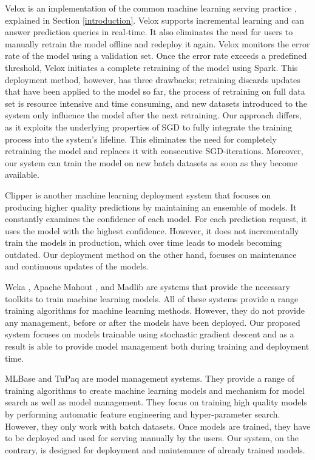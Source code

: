 \documentclass{vldb}
\begin{document}
Velox is an implementation of the common machine learning serving practice \cite{crankshaw2014missing}, explained in Section \ref{introduction}.
Velox supports incremental learning and can answer prediction queries in real-time.
It also eliminates the need for users to manually retrain the model offline and redeploy it again.
Velox monitors the error rate of the model using a validation set.
Once the error rate exceeds a predefined threshold, Velox initiates a complete retraining of the model using Spark. 
This deployment method, however, has three drawbacks; retraining discards updates that have been applied to the model so far, the process of retraining on full data set is resource intensive and time consuming, and new datasets introduced to the system only influence the model after the next retraining.
Our approach differs, as it exploits the underlying properties of SGD to fully integrate the training process into the system's lifeline.
This eliminates the need for completely retraining the model and replaces it with consecutive SGD-iterations.
Moreover, our system can train the model on new batch datasets as soon as they become available.

Clipper \cite{crankshaw2016clipper} is another machine learning deployment system that focuses on producing higher quality predictions by maintaining an ensemble of models.
It constantly examines the confidence of each model.
For each prediction request, it uses the model with the highest confidence.
However, it does not incrementally train the models in production, which over time leads to models becoming outdated.
Our deployment method on the other hand, focuses on maintenance and continuous updates of the models.

Weka \cite{hall2009weka}, Apache Mahout \cite{Owen:2011:MA:2132656}, and Madlib \cite{hellerstein2012madlib} are systems that provide the necessary toolkits to train machine learning models. 
All of these systems provide a range training algorithms for machine learning methods. 
However, they do not provide any management, before or after the models have been deployed. 
Our proposed system focuses on models trainable using stochastic gradient descent and as a result is able to provide model management both during training and deployment time.

MLBase \cite{kraska2013mlbase} and TuPaq \cite{sparks2015tupaq} are model management systems.
They provide a range of training algorithms to create machine learning models and mechanism for model search as well as model management.
They focus on training high quality models by performing automatic feature engineering and hyper-parameter search.
However, they only work with batch datasets.
Once models are trained, they have to be deployed and used for serving manually by the users.
Our system, on the contrary, is designed for deployment and maintenance of already trained models.
\end{document}
